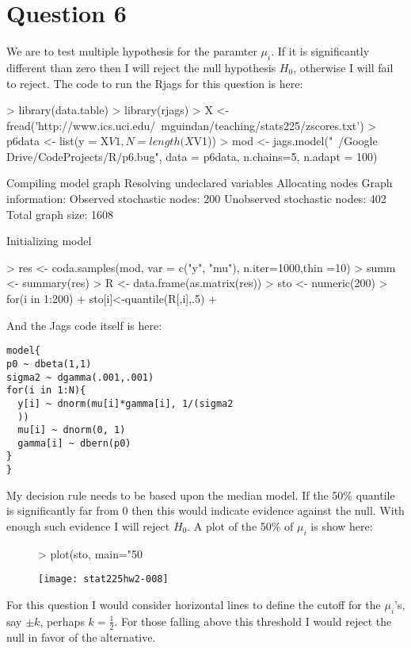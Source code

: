 \documentclass{article}
\begin{document}
\section*{Question 6}
We are to test multiple hypothesis for the paramter $ \mu_i $. If it is significantly different than zero then I will reject the null hypothesis $ H_0 $, otherwise I will fail to reject. The code to run the Rjags for this question is here:
\begin{Schunk}
\begin{Sinput}
> library(data.table)
> library(rjags)
> X <-fread('http://www.ics.uci.edu/~mguindan/teaching/stats225/zscores.txt')
> p6data <-  list(y = X$V1, N = length(X$V1))
> mod <- jags.model("~/Google Drive/CodeProjects/R/p6.bug", data = p6data, n.chains=5, n.adapt = 100)
\end{Sinput}
\begin{Soutput}
Compiling model graph
   Resolving undeclared variables
   Allocating nodes
Graph information:
   Observed stochastic nodes: 200
   Unobserved stochastic nodes: 402
   Total graph size: 1608

Initializing model
\end{Soutput}
\begin{Sinput}
> res <- coda.samples(mod, var = c("y", "mu"), n.iter=1000,thin =10)
> summ <- summary(res)
> R <- data.frame(as.matrix(res))
> sto <- numeric(200)
> for(i in 1:200){
+   sto[i]<-quantile(R[,i],.5)
+ }
\end{Sinput}
\end{Schunk}
And the Jags code itself is here:
\begin{verbatim}
model{
p0 ~ dbeta(1,1)
sigma2 ~ dgamma(.001,.001)
for(i in 1:N){
  y[i] ~ dnorm(mu[i]*gamma[i], 1/(sigma2
  ))
  mu[i] ~ dnorm(0, 1)
  gamma[i] ~ dbern(p0)
}
}
\end{verbatim}

My decision rule needs to be based upon the median model. If the 50\% quantile is significantly far from 0 then this would indicate evidence against the null. With enough such evidence I will reject $H_0$. A plot of the 50\% of $ \mu_i $ is show here:
\begin{figure}[H]
\centering
\begin{Schunk}
\begin{Sinput}
> plot(sto, main="50% Percentiles of mean's", ylab ="Percentile", col="blue")
\end{Sinput}
\end{Schunk}
\texttt{[image: stat225hw2-008]}
\end{figure}
For this question I would consider horizontal lines to define the cutoff for the $ \mu_i $'s, say $ \pm  k $, perhaps $ k = \frac{1}{2} $. For those falling above this threshold I would reject the null in favor of the alternative. 
\end{document}
